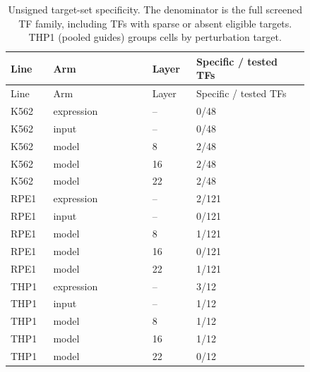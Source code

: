 \begin{longtable}{@{}L{0.12\linewidth}L{0.28\linewidth}L{0.12\linewidth}L{0.32\linewidth}@{}}
\caption{Unsigned target-set specificity. The denominator is the full screened TF family, including TFs with sparse or absent eligible targets. THP1 (pooled guides) groups cells by perturbation target.}\\
\toprule
Line & Arm & Layer & Specific / tested TFs \\
\midrule
\endfirsthead
\toprule
Line & Arm & Layer & Specific / tested TFs \\
\midrule
\endhead
\endfoot
\bottomrule
\endlastfoot
K562 & expression & -- & 0/48 \\
K562 & input & -- & 0/48 \\
K562 & model & 8 & 2/48 \\
K562 & model & 16 & 2/48 \\
K562 & model & 22 & 2/48 \\
RPE1 & expression & -- & 2/121 \\
RPE1 & input & -- & 0/121 \\
RPE1 & model & 8 & 1/121 \\
RPE1 & model & 16 & 0/121 \\
RPE1 & model & 22 & 1/121 \\
THP1 & expression & -- & 3/12 \\
THP1 & input & -- & 1/12 \\
THP1 & model & 8 & 1/12 \\
THP1 & model & 16 & 1/12 \\
THP1 & model & 22 & 0/12 \\
\end{longtable}
